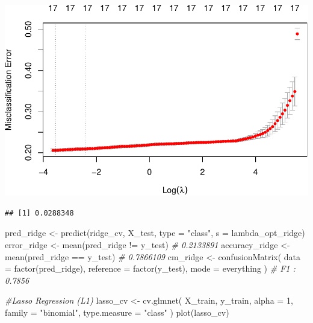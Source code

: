 \documentclass[
]{article}
\newenvironment{Shaded}{\begin{snugshade}}{\end{snugshade}}
\newcommand{\AttributeTok}[1]{\textcolor[rgb]{0.77,0.63,0.00}{#1}}
\newcommand{\CommentTok}[1]{\textcolor[rgb]{0.56,0.35,0.01}{\textit{#1}}}
\newcommand{\DecValTok}[1]{\textcolor[rgb]{0.00,0.00,0.81}{#1}}
\newcommand{\FunctionTok}[1]{\textcolor[rgb]{0.00,0.00,0.00}{#1}}
\newcommand{\NormalTok}[1]{#1}
\newcommand{\OtherTok}[1]{\textcolor[rgb]{0.56,0.35,0.01}{#1}}
\newcommand{\SpecialCharTok}[1]{\textcolor[rgb]{0.00,0.00,0.00}{#1}}
\newcommand{\StringTok}[1]{\textcolor[rgb]{0.31,0.60,0.02}{#1}}
\begin{document}
\includegraphics{Rain_Australia_files/figure-latex/unnamed-chunk-1-1.pdf}

\begin{Shaded}
\end{Shaded}

\begin{verbatim}
## [1] 0.0288348
\end{verbatim}

\begin{Shaded}
\begin{Highlighting}[]
\NormalTok{pred\_ridge }\OtherTok{\textless{}{-}}
  \FunctionTok{predict}\NormalTok{(ridge\_cv, X\_test, }\AttributeTok{type =} \StringTok{"class"}\NormalTok{, }\AttributeTok{s =}\NormalTok{ lambda\_opt\_ridge)}
\NormalTok{error\_ridge }\OtherTok{\textless{}{-}} \FunctionTok{mean}\NormalTok{(pred\_ridge }\SpecialCharTok{!=}\NormalTok{ y\_test) }\CommentTok{\# 0.2133891}
\NormalTok{accuracy\_ridge }\OtherTok{\textless{}{-}} \FunctionTok{mean}\NormalTok{(pred\_ridge }\SpecialCharTok{==}\NormalTok{ y\_test) }\CommentTok{\# 0.7866109}
\NormalTok{cm\_ridge }\OtherTok{\textless{}{-}}
  \FunctionTok{confusionMatrix}\NormalTok{(}
    \AttributeTok{data =} \FunctionTok{factor}\NormalTok{(pred\_ridge),}
    \AttributeTok{reference =} \FunctionTok{factor}\NormalTok{(y\_test),}
    \AttributeTok{mode =} \StringTok{\textquotesingle{}everything\textquotesingle{}}
\NormalTok{  ) }\CommentTok{\# F1 : 0.7856}

\CommentTok{\#Lasso Regression (L1)}
\NormalTok{lasso\_cv }\OtherTok{\textless{}{-}}
  \FunctionTok{cv.glmnet}\NormalTok{(}
\NormalTok{    X\_train,}
\NormalTok{    y\_train,}
    \AttributeTok{alpha =} \DecValTok{1}\NormalTok{,}
    \AttributeTok{family =} \StringTok{"binomial"}\NormalTok{,}
    \AttributeTok{type.measure =} \StringTok{"class"}
\NormalTok{  )}
\FunctionTok{plot}\NormalTok{(lasso\_cv)}
\end{Highlighting}
\end{Shaded}
\end{document}
